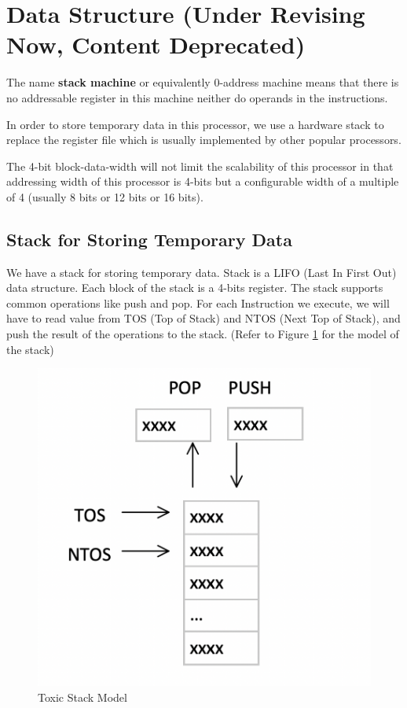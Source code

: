 \documentclass[11pt]{report}
\begin{document}
    \section{Data Structure (Under Revising Now, Content Deprecated)}
    The name \textbf{stack machine} or equivalently 0-address machine means that 
    there is no addressable register in this machine neither do operands in the instructions. \par
    
    In order to store temporary data in this processor, we use a hardware stack to replace 
    the register file which is usually implemented by other popular processors. \par

    The 4-bit block-data-width will not limit the scalability of this processor in that addressing
    width of this processor is 4-bits but a configurable width of a multiple of 4 
    (usually 8 bits or 12 bits or 16 bits).

    \subsection{Stack for Storing Temporary Data}
    We have a stack for storing temporary data. 
    Stack is a LIFO (Last In First Out) data structure.
    Each block of the stack is a 4-bits register.
    The stack supports common operations like push and pop. For each Instruction we execute,
    we will have to read value from TOS (Top of Stack) and NTOS (Next Top of Stack), 
    and push the result of the operations to the stack.
    (Refer to Figure \ref{figure:stack_model} for the model of the stack)
    \begin{figure}[h!]
        \centering
        \includegraphics[scale=0.6]{Toxic_Stack_Model.png}
        \caption{Toxic Stack Model}
        \label{figure:stack_model}
    \end{figure}
\end{document}
